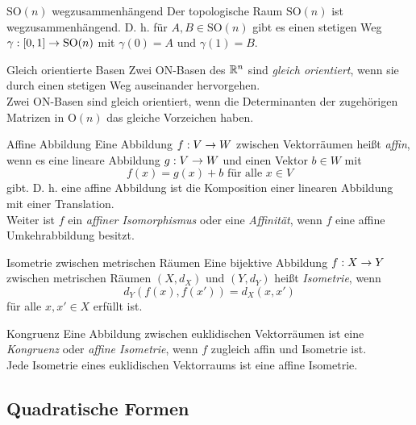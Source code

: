 \documentclass[main.tex]{subfiles}
\begin{document}
\begin{karte}{\( \mathrm{SO}(n) \) wegzusammenhängend}
    Der topologische Raum \( \mathrm{SO}(n) \) ist 
    wegzusammenhängend. D. h. für \( A,B\in \mathrm{SO}(n) \) 
    gibt es einen stetigen Weg \( \gamma : [0,1] \rightarrow \mathrm{SO}(n) \)
    mit \( \gamma(0) = A \) und \( \gamma(1) = B \).
\end{karte}

\begin{karte}{Gleich orientierte Basen}
    Zwei ON-Basen des \(\mathbb{R}^n\) sind \textit{gleich orientiert}, 
    wenn sie durch einen stetigen Weg auseinander hervorgehen.\\
    Zwei ON-Basen sind gleich orientiert, wenn die 
    Determinanten der zugehörigen Matrizen in \( \mathrm{O}(n) \) 
    das gleiche Vorzeichen haben.
\end{karte}

\begin{karte}{Affine Abbildung}
    Eine Abbildung \( f : V \rightarrow W \) zwischen Vektorräumen 
    heißt \textit{affin}, wenn es eine lineare Abbildung 
    \( g : V \rightarrow W \) und einen Vektor \( b \in W \) mit 
    \[ f(x) = g(x) + b \text{ für alle }x\in V \]
    gibt. D. h. eine affine Abbildung ist die Komposition 
    einer linearen Abbildung mit einer Translation.\\
    Weiter ist \(f\) ein \textit{affiner Isomorphismus} 
    oder eine \textit{Affinität}, wenn \(f\) eine affine 
    Umkehrabbildung besitzt.
\end{karte}

\begin{karte}{Isometrie zwischen metrischen Räumen}
    Eine bijektive Abbildung \( f : X \rightarrow Y \) 
    zwischen metrischen Räumen \( (X, d_X) \) und 
    \( (Y, d_Y) \) heißt \textit{Isometrie}, wenn 
    \[ d_Y(f(x), f(x')) = d_X(x,x') \] 
    für alle \( x,x' \in X \) erfüllt ist.
\end{karte}

\begin{karte}{Kongruenz}
    Eine Abbildung zwischen euklidischen 
    Vektorräumen ist eine \textit{Kongruenz}
    oder \textit{affine Isometrie}, wenn \(f\) 
    zugleich affin und Isometrie ist.\\
    Jede Isometrie eines euklidischen Vektorraums ist 
    eine affine Isometrie.
\end{karte}

\subsection*{Quadratische Formen}
\end{document}
